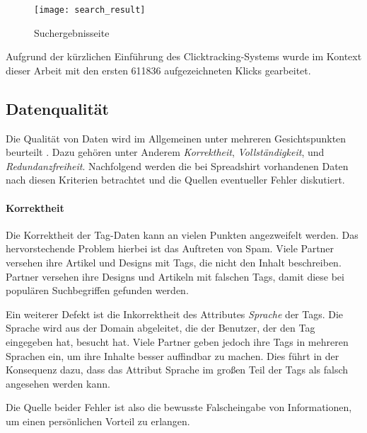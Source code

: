 \begin{figure}
\centering
\texttt{[image: search\_result]}
\caption{Suchergebnisseite}
\label{fig:search_result}
\end{figure}

Aufgrund der kürzlichen Einführung des Clicktracking-Systems wurde im Kontext dieser Arbeit mit den ersten \num{611836} aufgezeichneten Klicks gearbeitet.

\subsection{Datenqualität}
\label{quality}

Die Qualität von Daten wird im Allgemeinen unter mehreren Gesichtspunkten beurteilt \cite{hkp2012}. Dazu gehören unter Anderem \emph{Korrektheit}, \emph{Vollständigkeit}, und \emph{Redundanzfreiheit}. Nachfolgend werden die bei Spreadshirt vorhandenen Daten nach diesen Kriterien betrachtet und die Quellen eventueller Fehler \cite[43 ff]{jo2003} diskutiert.

\paragraph{Korrektheit}

Die Korrektheit der Tag-Daten kann an vielen Punkten angezweifelt werden. Das hervorstechende Problem hierbei ist das Auftreten von Spam. Viele Partner versehen ihre Artikel und Designs mit Tags, die nicht den Inhalt beschreiben. Partner versehen ihre Designs und Artikeln mit falschen Tags, damit diese bei populären Suchbegriffen gefunden werden.

Ein weiterer Defekt ist die Inkorrektheit des Attributes \emph{Sprache} der Tags. Die Sprache wird aus der Domain abgeleitet, die der Benutzer, der den Tag eingegeben hat, besucht hat. Viele Partner geben jedoch ihre Tags in mehreren Sprachen ein, um ihre Inhalte besser auffindbar zu machen. Dies führt in der Konsequenz dazu, dass das Attribut Sprache im großen Teil der Tags als falsch angesehen werden kann.

Die Quelle beider Fehler ist also die bewusste Falscheingabe von Informationen, um einen persönlichen Vorteil zu erlangen.
                                                                                                                                                                                                                                                                                                                                                                                                              
